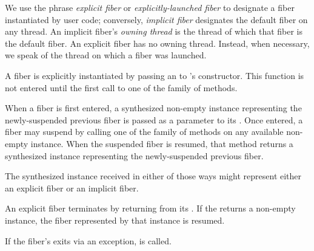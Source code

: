 We use the phrase \emph{explicit fiber} or \emph{explicitly-launched fiber} to
designate a fiber instantiated by user code; conversely, \emph{implicit fiber}
designates the default fiber on any thread. An implicit fiber's \emph{owning
thread} is the thread of which that fiber is the default fiber. An explicit
fiber has no owning thread. Instead, when necessary, we speak of the thread on
which a fiber was launched.

A fiber is explicitly instantiated by passing an \emph{\entryfn} to \fiber's
constructor. This function is not entered until the first call to one of
the  family of methods.

When a fiber is first entered, a synthesized non-empty \fiber instance
representing the newly-suspended previous fiber is passed as a parameter to
its \entryfn. Once entered, a fiber may suspend by calling one of the \resume
family of methods on any available non-empty \fiber instance. When the
suspended fiber is resumed, that method returns a synthesized \fiber instance
representing the newly-suspended previous fiber.

The synthesized \fiber instance received in either of those ways might
represent either an explicit fiber or an implicit fiber.

An explicit fiber terminates by returning from its \entryfn. If the \entryfn
returns a non-empty \fiber instance, the fiber represented by that \fiber
instance is resumed.



If the fiber's \entryfn exits via an exception,  is called.


